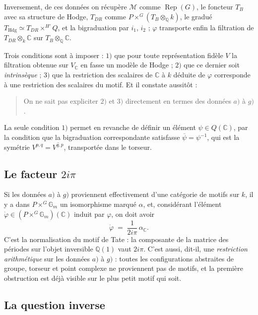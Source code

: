 \documentclass[11pt,a4paper]{article}
\begin{document}
Inversement, de ces données on récupère $\mathcal{M}$ comme
$\operatorname{Rep}(G)$, le foncteur $T_{B}$ avec sa structure de Hodge,
$T_{DR}$ comme $P \times^{G} (T_{B} \otimes_{\mathbb{Q}} k)$, le gradué
$T_{\mathrm{Hdg}} \simeq T_{DR} \times^{H'} Q$, et la bigraduation par $i_{1}$,
$i_{2}$ ; $\varphi$ transporte enfin la filtration de $T_{DR} \otimes_{k}
\mathbb{C}$ sur $T_{B} \otimes_{\mathbb{Q}} \mathbb{C}$.

Trois conditions sont à imposer : $1)$ que pour toute représentation fidèle $V$
la filtration obtenue sur $V_{\mathbb{C}}$ en fasse un modèle de Hodge ; $2)$ que
ce dernier soit \emph{intrinsèque} ; $3)$ que la restriction des scalaires de
$\mathbb{C}$ à $k$ déduite de $\varphi$ corresponde à une restriction des
scalaires du motif. Et il constate aussitôt :

\begin{quote}
On ne sait pas expliciter $2)$ et $3)$ directement en termes des données
$a)$ à $g)$.
\end{quote}

La seule condition $1)$ permet en revanche de définir un élément
$\psi \in Q(\mathbb{C})$, par la condition que la bigraduation correspondante
satisfasse $\overline{\psi} = \psi^{-1}$, qui est la symétrie
$V^{p,q} = \overline{V^{q,p}}$, transportée dans le torseur.

\subsection*{Le facteur $2i\pi$}

Si les données $a)$ à $g)$ proviennent effectivement d'une catégorie de motifs
sur $k$, il y a dans $P \times^{G} \mathbb{G}_{m}$ un isomorphisme marqué
$\alpha$, et, considérant l'élément $\dot{\varphi} \in (P \times^{G}
\mathbb{G}_{m})(\mathbb{C})$ induit par $\varphi$, on doit avoir
\[
\dot{\varphi} \;=\; \frac{1}{2 i \pi}\, \alpha_{\mathbb{C}} .
\]
C'est la normalisation du motif de Tate : la composante de la matrice des
périodes sur l'objet inversible $\mathbb{Q}(1)$ vaut $2i\pi$.
C'est aussi, dit-il, une \emph{restriction arithmétique} sur les données $a)$ à
$g)$ : toutes les configurations abstraites de groupe, torseur et point complexe
ne proviennent pas de motifs, et la première obstruction est déjà visible sur le
plus petit motif qui soit.

\subsection*{La question inverse}
\end{document}
